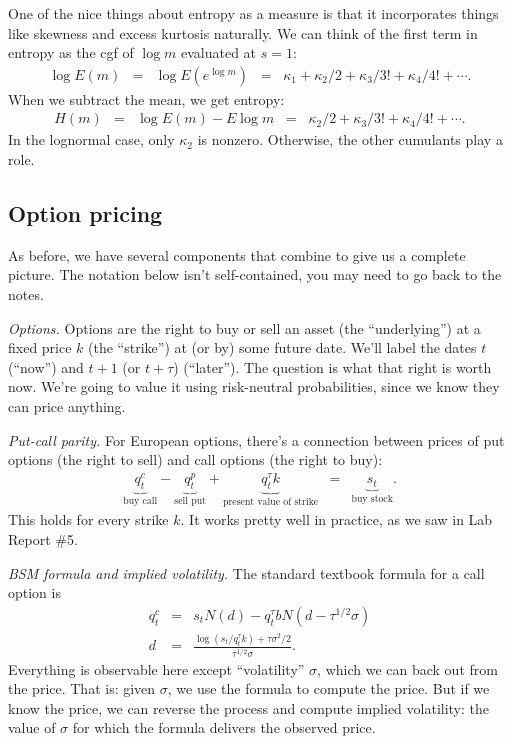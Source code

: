 \documentclass[11pt]{article}
\begin{document}
One of the nice things about entropy as a measure is that it incorporates
things like skewness and excess kurtosis naturally. 
We can think of the first term in entropy as the cgf of $\log m$ 
evaluated at $s=1$:  
\begin{eqnarray*}
   \log E(m) &=& \log E \left( e^{\log m}\right) 
        \;\;=\;\; \kappa_1 + \kappa_2/ 2 + \kappa_3/3! + \kappa_4/4! + \cdots .
\end{eqnarray*}
When we subtract the mean, we get entropy:   
\begin{eqnarray*}
   H(m)  &=& \log E(m) - E \log m 
        \;\;=\;\; \kappa_2/ 2 + \kappa_3/3! + \kappa_4/4! + \cdots .
\end{eqnarray*}
In the lognormal case, only $\kappa_2$ is nonzero.  
Otherwise, the other cumulants play a role.  


\subsection*{Option pricing}

As before, we have several components that combine to give us a complete picture.  
The notation below isn't self-contained, you may need to go back to the notes.  


{\it Options.\/}
Options are the right to buy or sell an asset 
(the ``underlying'') 
at a fixed price $k$ (the ``strike'') 
at (or by) some future date.
We'll label the dates $t$ (``now'') and $t+1$ (or $t+\tau$) (``later'').  
The question is what that right is worth now.
We're going to value it using risk-neutral probabilities, since we know they can 
price anything.  

{\it Put-call parity.\/}
For European options, there's a connection between prices of put options
(the right to sell) and call options (the right to buy): 
\begin{eqnarray*}
    \underbrace{q^c_t}_{\mbox{buy call}} -
    \underbrace{q^p_t}_{\mbox{sell put}} +
    \underbrace{q^\tau_t k}_{\mbox{present value of strike}}
    &=&
    \underbrace{s_t}_{\mbox{buy stock}} .
    \label{eq:put-call-parity}
\end{eqnarray*} 
This holds for every strike $k$.
It works pretty well in practice, as we saw in Lab Report \#5. 

{\it BSM formula and implied volatility.\/} 
The standard textbook formula for a call option is 
\begin{eqnarray*}
        q^c_t &=& s_t N(d) - q^\tau_t b N (d - \tau^{1/2}\sigma ) \\
          d &=& \frac{\log(s_t/q^\tau_t k) + \tau \sigma^2/2}{\tau^{1/2}\sigma} .
\end{eqnarray*}
Everything is observable here except ``volatility'' $\sigma$, which 
we can back out from the price.  
That is: given $\sigma$, we use the formula to compute the price. 
But if we know the price, we can reverse the process and compute  
implied volatility:  the value of $\sigma$ for which the formula
delivers the observed price.  
\end{document}

